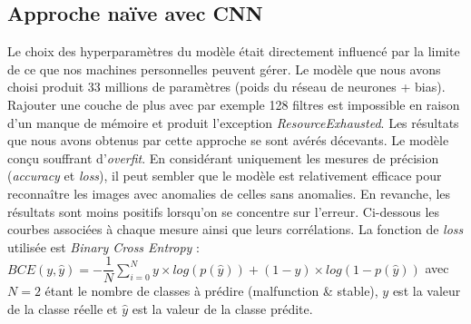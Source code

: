 \documentclass[french]{article}
\theoremstyle{mytheoremstyle}
\theoremstyle{mytheoremstyle}
\theoremstyle{myproblemstyle}
\begin{document}
    \subsection{Approche naïve avec CNN}
    Le choix des hyperparamètres du modèle était directement influencé par la limite de ce que nos machines personnelles peuvent gérer. Le modèle que nous avons choisi produit 33 millions de paramètres (poids du réseau de neurones + bias). Rajouter une couche de plus avec par exemple 128 filtres est impossible en raison d'un manque de mémoire et produit l'exception \textit{ResourceExhausted}.
    \newline
    \indent Les résultats que nous avons obtenus par cette approche se sont avérés décevants. Le modèle conçu souffrant d'\emph{overfit}. En considérant uniquement les mesures de précision (\emph{accuracy} et \emph{loss}), il peut sembler que le modèle est relativement efficace pour reconnaître les images avec anomalies de celles sans anomalies. En revanche, les résultats sont moins positifs lorsqu'on se concentre sur l'erreur. Ci-dessous les courbes associées à chaque mesure ainsi que leurs corrélations. La fonction de \emph{loss} utilisée est \textit{Binary Cross Entropy} : $BCE(y, \hat{y}) = -\dfrac{1}{N} \sum\limits_{i=0}^{N} y \times log(p(\hat{y})) + (1-y) \times log(1-p(\hat{y}))$ avec $N=2$ étant le nombre de classes à prédire (malfunction \& stable), $y$ est la valeur de la classe réelle et $\hat{y}$ est la valeur de la classe prédite.
\end{document}
